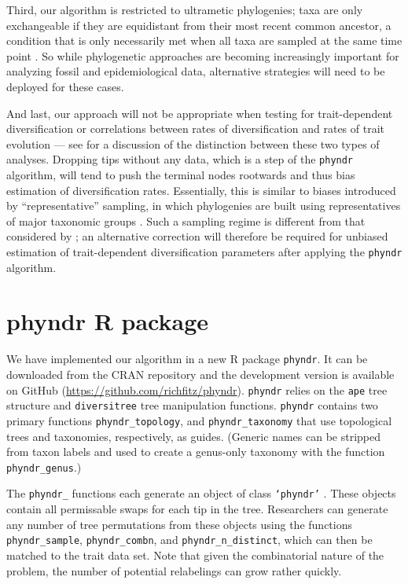 \documentclass[a4paper,11pt]{article}
\newcommand{\phyndr}{\tt phyndr}
\begin{document}
Third, our algorithm is restricted to ultrametic phylogenies; taxa are only exchangeable if they are equidistant from their most recent common ancestor, a condition that is only necessarily met when all taxa are sampled at the same time point \citep[see][for more discussion of this point and its implications for models of trait evolution]{SlaterMEE}. So while phylogenetic approaches are becoming increasingly important for analyzing fossil and epidemiological data, alternative strategies will need to be deployed for these cases.

And last, our approach will not be appropriate when testing for trait-dependent diversification \citep[e.g.,][]{Maddison2007, FitzJohn2012} or correlations between rates of diversification and rates of trait evolution \citep[e.g.,][]{Rabosky2013, Rabosky2014} --- see \citealt{PennellPE} for a discussion of the distinction between these two types of analyses. Dropping tips without any data, which is a step of the {\phyndr} algorithm, will tend to push the terminal nodes rootwards and thus bias estimation of diversification rates. Essentially, this is similar to biases introduced by ``representative'' sampling, in which phylogenies are built using representatives of major taxonomic groups \citep{Hohna2011, Stadler2013}. Such a sampling regime is different from that considered by \citet{FitzJohn2009}; an alternative correction will therefore be required for unbiased estimation of trait-dependent diversification parameters after applying the {\phyndr} algorithm. 

\section{phyndr R package}

We have implemented our algorithm in a new R package {\phyndr}. It can be downloaded from the CRAN repository and the development version is available on GitHub (\url{https://github.com/richfitz/phyndr}). {\phyndr} relies on the \texttt{ape} \citep{ape} tree structure and \texttt{diversitree} \citep{FitzJohn2012} tree manipulation functions. {\phyndr} contains two primary functions \texttt{phyndr\_topology}, and \texttt{phyndr\_taxonomy} that use topological trees and taxonomies, respectively, as guides. (Generic names can be stripped from taxon labels and used to create a genus-only taxonomy with the function \texttt{phyndr\_genus}.)
 
The \texttt{phyndr\_} functions each generate an object of class \texttt{`phyndr'} \citep[these are also of class \texttt{`phylo'}][such that all regular phylogenetic operations are still possible]{ape}. These objects contain all permissable swaps for each tip in the tree. Researchers can generate any number of tree permutations from these objects using the functions \texttt{phyndr\_sample}, \texttt{phyndr\_combn}, and \texttt{phyndr\_n\_distinct}, which can then be matched to the trait data set.  Note that given the combinatorial nature of the problem, the number of potential relabelings can grow rather quickly.
\end{document}

